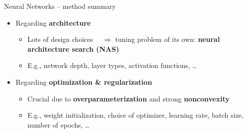 \begin{frame}{Neural Networks -- method summary}
\begin{itemize}
  \item Regarding \textbf{architecture}
  \begin{itemize}
    \item Lots of design choices ~~$\Rightarrow$ tuning problem of its own: 
    \textbf{neural architecture search (NAS)}
    \item E.g., network depth, layer types, activation functions, \dots
  \end{itemize}
  \item Regarding \textbf{optimization \& regularization}
  \begin{itemize}
    \item Crucial due to \textbf{overparameterization} and strong 
    \textbf{nonconvexity} 
    \item E.g., weight initialization, choice of optimizer, learning rate, 
    batch size, number of epochs, \dots
  \end{itemize}
\end{itemize}

\medskip


\end{frame}


